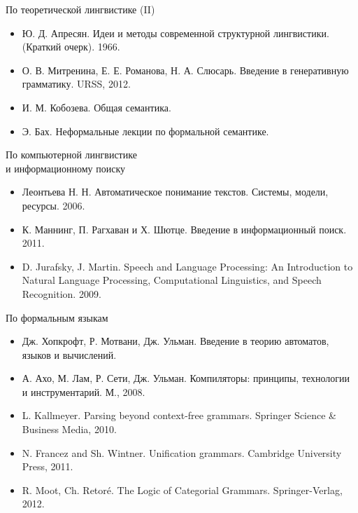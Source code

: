 \documentclass{beamer}
\begin{document}
\begin{frame}{По теоретической лингвистике (II)}
\begin{itemize}
	\item Ю. Д. Апресян. Идеи и методы современной структурной лингвистики. (Краткий очерк). 1966.
	\medskip
	\item О. В. Митренина, Е. Е. Романова, Н. А. Слюсарь. Введение в генеративную грамматику. URSS, 2012.
	\medskip
	\item И. М. Кобозева. Общая семантика.
	\medskip
	\item Э. Бах. Неформальные лекции по формальной семантике.
\end{itemize}
\end{frame}


\begin{frame}{По компьютерной лингвистике \\и информационному поиску}
\begin{itemize}
	\item Леонтьева Н. Н. Автоматическое понимание текстов. Системы, модели, ресурсы. 2006.
	\medskip
	\item К. Маннинг, П. Рагхаван и Х. Шютце. Введение в информационный поиск. 2011.
	\medskip
	\item D. Jurafsky, J. Martin. Speech and Language Processing: An Introduction to Natural Language Processing, Computational Linguistics, and Speech Recognition. 2009.
\end{itemize}
\end{frame}

\begin{frame}{По формальным языкам}
\begin{itemize}
	\item Дж. Хопкрофт, Р. Мотвани, Дж. Ульман. Введение в теорию автоматов, языков и вычислений.
	\medskip
	\item А. Ахо, М. Лам, Р. Сети, Дж. Ульман. Компиляторы: принципы, технологии и инструментарий. М., 2008.
	\medskip
	\item L. Kallmeyer. Parsing beyond context-free grammars. Springer Science \& Business Media, 2010.
	\medskip
	\item N. Francez and Sh. Wintner. Unification grammars. Cambridge University Press, 2011.
	\medskip
	\item R. Moot, Ch. Retor\'e. The Logic of Categorial Grammars. Springer-Verlag, 2012.
\end{itemize}
\end{frame}
\end{document}
